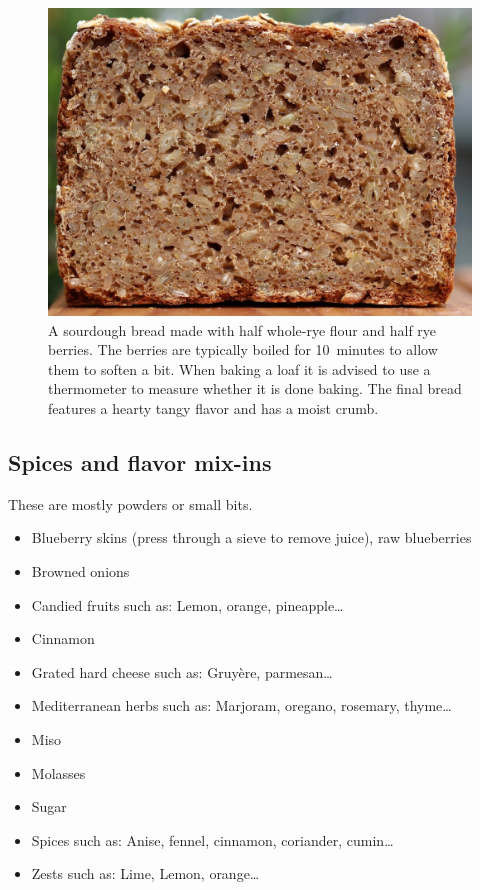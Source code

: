 \begin{figure}[htb!]
  \centering
  \includegraphics[width=\textwidth]{seeds-bread}
  \caption[Whole-rye with rye berries]{A sourdough bread made with half
      whole-rye flour and half rye berries. The berries are typically boiled
      for 10~minutes to allow them to soften a bit. When baking a loaf it is
      advised to use a thermometer to measure whether it is done baking. The
      final bread features a hearty tangy flavor and has a moist crumb.}%
\end{figure}

\subsection{Spices and flavor mix-ins}
These are mostly powders or small bits.

\begin{itemize}
  \item Blueberry skins (press through a sieve to remove juice), raw
      blueberries
  \item Browned onions
  \item Candied fruits such as: Lemon, orange, pineapple\dots{}
  \item Cinnamon
  \item Grated hard cheese such as: Gruyère, parmesan\dots{}
  \item Mediterranean herbs such as: Marjoram, oregano, rosemary, thyme\dots{}
  \item Miso
  \item Molasses
  \item Sugar
  \item Spices such as: Anise, fennel, cinnamon, coriander, cumin\dots{}
  \item Zests such as: Lime, Lemon, orange\dots{}
\end{itemize}

